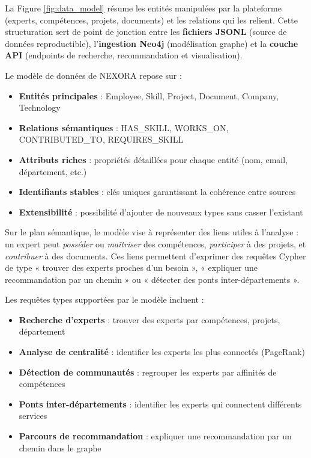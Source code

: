 \documentclass[12pt,a4paper]{report}
\begin{document}
La Figure \ref{fig:data_model} résume les entités manipulées par la plateforme (experts, compétences, projets, documents) et les relations qui les relient. Cette structuration sert de point de jonction entre les \textbf{fichiers JSONL} (source de données reproductible), l'\textbf{ingestion Neo4j} (modélisation graphe) et la \textbf{couche API} (endpoints de recherche, recommandation et visualisation).

Le modèle de données de NEXORA repose sur :
\begin{itemize}
  \item \textbf{Entités principales} : Employee, Skill, Project, Document, Company, Technology
  \item \textbf{Relations sémantiques} : HAS\_SKILL, WORKS\_ON, CONTRIBUTED\_TO, REQUIRES\_SKILL
  \item \textbf{Attributs riches} : propriétés détaillées pour chaque entité (nom, email, département, etc.)
  \item \textbf{Identifiants stables} : clés uniques garantissant la cohérence entre sources
  \item \textbf{Extensibilité} : possibilité d'ajouter de nouveaux types sans casser l'existant
\end{itemize}

Sur le plan sémantique, le modèle vise à représenter des liens utiles à l'analyse : un expert peut \emph{posséder} ou \emph{maîtriser} des compétences, \emph{participer} à des projets, et \emph{contribuer} à des documents. Ces liens permettent d'exprimer des requêtes Cypher de type « trouver des experts proches d'un besoin », « expliquer une recommandation par un chemin » ou « détecter des ponts inter-départements ».

Les requêtes types supportées par le modèle incluent :
\begin{itemize}
  \item \textbf{Recherche d'experts} : trouver des experts par compétences, projets, département
  \item \textbf{Analyse de centralité} : identifier les experts les plus connectés (PageRank)
  \item \textbf{Détection de communautés} : regrouper les experts par affinités de compétences
  \item \textbf{Ponts inter-départements} : identifier les experts qui connectent différents services
  \item \textbf{Parcours de recommandation} : expliquer une recommandation par un chemin dans le graphe
\end{itemize}
\end{document}

